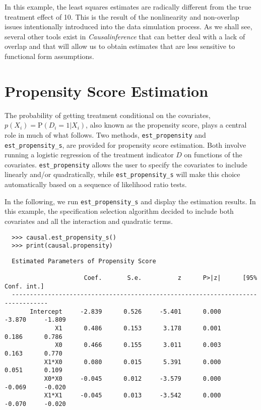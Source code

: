 \documentclass[12pt]{article}
\renewcommand{\P}{\mathrm{P}}
\theoremstyle{definition}
\theoremstyle{definition}
\theoremstyle{definition}
\theoremstyle{remark}
\begin{document}
In this example, the least squares estimates are radically different from the true treatment effect of 10. This is the result of the nonlinearity and non-overlap issues intentionally introduced into the data simulation process. As we shall see, several other tools exist in \textit{Causalinference} that can better deal with a lack of overlap and that will allow us to obtain estimates that are less sensitive to functional form assumptions.


\section{Propensity Score Estimation} \label{sec.c}

The probability of getting treatment conditional on the covariates, $p(X_i) = \P(D_i=1|X_i)$, also known as the propensity score, plays a central role in much of what follows. Two methods, \texttt{est\_propensity} and \texttt{est\_propensity\_s}, are provided for propensity score estimation. Both involve running a logistic regression of the treatment indicator $D$ on functions of the covariates. \texttt{est\_propensity} allows the user to specify the covariates to include linearly and/or quadratically, while \texttt{est\_propensity\_s} will make this choice automatically based on a sequence of likelihood ratio tests.

In the following, we run \texttt{est\_propensity\_s} and display the estimation results. In this example, the specification selection algorithm decided to include both covariates and all the interaction and quadratic terms.

\begin{verbatim}
  >>> causal.est_propensity_s()
  >>> print(causal.propensity)
\end{verbatim}
\begin{verbatim}
  Estimated Parameters of Propensity Score
  
                      Coef.       S.e.          z      P>|z|      [95% Conf. int.]
  --------------------------------------------------------------------------------
       Intercept     -2.839      0.526     -5.401      0.000     -3.870     -1.809
              X1      0.486      0.153      3.178      0.001      0.186      0.786
              X0      0.466      0.155      3.011      0.003      0.163      0.770
           X1*X0      0.080      0.015      5.391      0.000      0.051      0.109
           X0*X0     -0.045      0.012     -3.579      0.000     -0.069     -0.020
           X1*X1     -0.045      0.013     -3.542      0.000     -0.070     -0.020
\end{verbatim}
\end{document}
